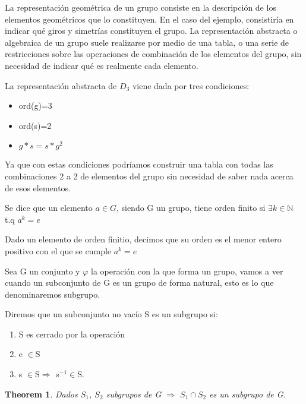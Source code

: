 \documentclass[a4paper,10pt]{apuntes}
\newtheorem{theorem}{Theorem}[section]
\newenvironment{definition}[1][Definition]{\begin{trivlist}
\item[\hskip \labelsep {\bfseries #1}]}{\end{trivlist}}
\newenvironment{example}[1][Example]{\begin{trivlist}
\item[\hskip \labelsep {\bfseries #1}]}{\end{trivlist}}
\begin{document}
 La representación geométrica de un grupo consiste en la descripción de los elementos geométricos que lo constituyen. En el 
 caso del ejemplo, consistiría en indicar qué giros y simetrías constituyen el grupo.
 La representación abstracta o algebraica de un grupo suele realizarse por medio de una tabla, o una serie de restricciones sobre las operaciones
 de combinación de los elementos del grupo, sin necesidad de indicar qué es realmente cada elemento.
 \begin{example}
  La representación abstracta de $D_{3}$  viene dada por tres condiciones:
 \begin{itemize}
  \item ord(g)=3
  \item ord(s)=2
  \item $g*s=s*g^{2}$
 \end{itemize}
 Ya que con estas condiciones podríamos construir una tabla con todas las combinaciones 2 a 2 de elementos del grupo sin necesidad
 de saber nada acerca de esos elementos.
 \end{example}
 
 \begin{definition}
  Se dice que un elemento $a\in G$, siendo G un grupo, tiene orden finito si $\exists k\in\mathds{N}$  t.q  $a^{k}=e$
 \end{definition}
 
 \begin{definition}
  Dado un elemento de orden finitio, decimos que su orden es el menor entero positivo con el que se cumple $a^{k}=e$
 \end{definition}

 Sea G un conjunto y $\varphi$  la operación con la que forma un grupo, vamos a ver cuando un subconjunto de G es un grupo de forma natural,
 esto es lo que denominaremos subgrupo.
 
 \begin{definition}
  Diremos que un subconjunto no vacío S es un subgrupo si:
  \begin{enumerate}
   \item S es cerrado por la operación
   \item e $\in$S
   \item s $\in$S$\Rightarrow$ $s^{-1}\in$S.
  \end{enumerate}
 \end{definition}
 
  \begin{theorem}
   Dados $S_{1}$, $S_{2}$ subgrupos de G $\Rightarrow$  $S_{1}\cap S_{2}$  es un subgrupo de G.
  \end{theorem}
\end{document}
